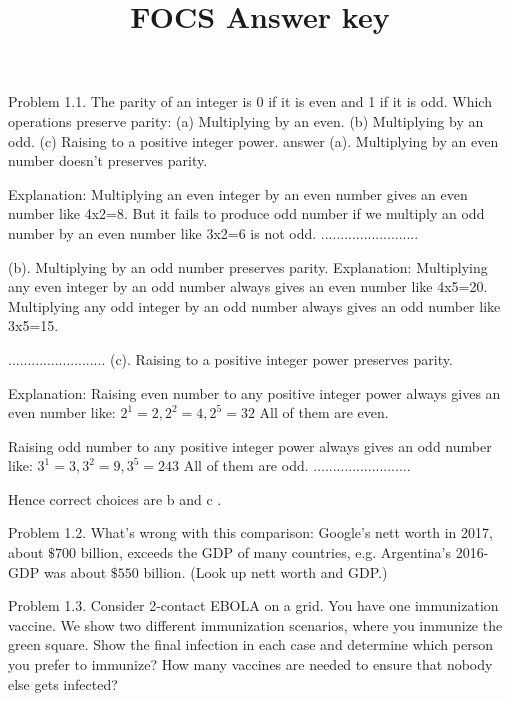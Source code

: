 \documentclass[10pt]{article}
\title{FOCS Answer key }
\author{}
\date{}
\begin{document}
\maketitle
Problem 1.1. The parity of an integer is 0 if it is even and 1 if it is odd. Which operations preserve parity:
(a) Multiplying by an even.
(b) Multiplying by an odd.
(c) Raising to a positive integer power.
answer
(a). Multiplying by an even number doesn't preserves parity.

Explanation:
Multiplying an even integer by an even number gives an even number like 4x2=8. But it fails to produce odd number if we multiply an odd number by an even number like 3x2=6 is not odd.
.........................

(b). Multiplying by an odd number preserves parity. Explanation: Multiplying any even integer by an odd number always gives an even number like 4x5=20.
Multiplying any odd integer by an odd number always gives an odd number like 3x5=15.

.........................
(c). Raising to a positive integer power preserves parity.

Explanation: Raising even number to any positive integer power always gives an even number like:
$2^1=2, 2^2=4, 2^5=32$
All of them are even.

Raising odd number to any positive integer power always gives an odd number like:
$3^1=3, 3^2=9, 3^5=243$
All of them are odd.
.........................

Hence correct choices are b and c .


Problem 1.2. What's wrong with this comparison: Google's nett worth in 2017, about $\$ 700$ billion, exceeds the GDP of many countries, e.g. Argentina's 2016-GDP was about $\$ 550$ billion. (Look up nett worth and GDP.)

Problem 1.3. Consider 2-contact EBOLA on a grid. You have one immunization vaccine. We show two different immunization scenarios, where you immunize the green square. Show the final infection in each case and determine which person you prefer to immunize? How many vaccines are needed to ensure that nobody else gets infected?
\end{document}

